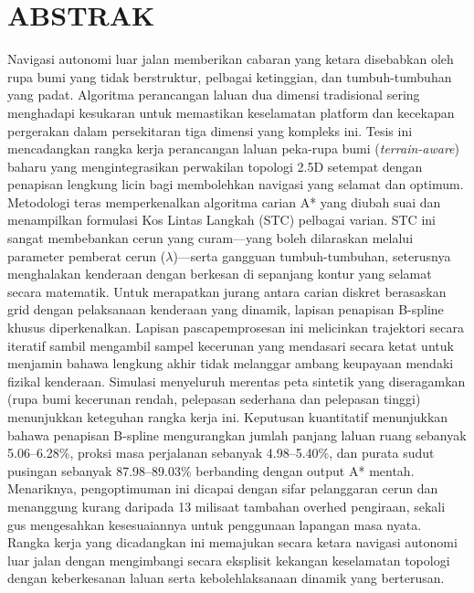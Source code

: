 \chapter{ABSTRAK}

\begin{singlespace}
\noindent
Navigasi autonomi luar jalan memberikan cabaran yang ketara disebabkan oleh rupa bumi yang tidak berstruktur, pelbagai ketinggian, dan tumbuh-tumbuhan yang padat. Algoritma perancangan laluan dua dimensi tradisional sering menghadapi kesukaran untuk memastikan keselamatan platform dan kecekapan pergerakan dalam persekitaran tiga dimensi yang kompleks ini. Tesis ini mencadangkan rangka kerja perancangan laluan peka-rupa bumi (\textit{terrain-aware}) baharu yang mengintegrasikan perwakilan topologi 2.5D setempat dengan penapisan lengkung licin bagi membolehkan navigasi yang selamat dan optimum. Metodologi teras memperkenalkan algoritma carian A* yang diubah suai dan menampilkan formulasi Kos Lintas Langkah (STC) pelbagai varian. STC ini sangat membebankan cerun yang curam---yang boleh dilaraskan melalui parameter pemberat cerun ($\lambda$)---serta gangguan tumbuh-tumbuhan, seterusnya menghalakan kenderaan dengan berkesan di sepanjang kontur yang selamat secara matematik. Untuk merapatkan jurang antara carian diskret berasaskan grid dengan pelaksanaan kenderaan yang dinamik, lapisan penapisan B-spline khusus diperkenalkan. Lapisan pascapemprosesan ini melicinkan trajektori secara iteratif sambil mengambil sampel kecerunan yang mendasari secara ketat untuk menjamin bahawa lengkung akhir tidak melanggar ambang keupayaan mendaki fizikal kenderaan. Simulasi menyeluruh merentas peta sintetik yang diseragamkan (rupa bumi kecerunan rendah, pelepasan sederhana dan pelepasan tinggi) menunjukkan keteguhan rangka kerja ini. Keputusan kuantitatif menunjukkan bahawa penapisan B-spline mengurangkan jumlah panjang laluan ruang sebanyak 5.06--6.28\%, proksi masa perjalanan sebanyak 4.98--5.40\%, dan purata sudut pusingan sebanyak 87.98--89.03\% berbanding dengan output A* mentah. Menariknya, pengoptimuman ini dicapai dengan sifar pelanggaran cerun dan menanggung kurang daripada 13 milisaat tambahan overhed pengiraan, sekali gus mengesahkan kesesuaiannya untuk penggunaan lapangan masa nyata. Rangka kerja yang dicadangkan ini memajukan secara ketara navigasi autonomi luar jalan dengan mengimbangi secara eksplisit kekangan keselamatan topologi dengan keberkesanan laluan serta kebolehlaksanaan dinamik yang berterusan.
\end{singlespace}